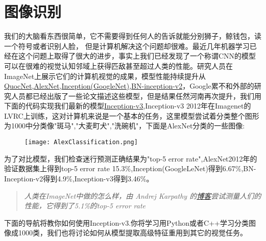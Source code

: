 \section{图像识别}
我们的大脑看东西很简单，它不需要得到任何人的告诉就能分别狮子，鲸钱包，读一个符号或者识别人脸，
但是计算机解决这个问题却很难。最近几年机器学习已经在这个问题上取得了很大的进步，事实上我们已经发现了一个称谓CNN的模型可以在很难的视觉认知邻域上获得匹敌甚至超过人类的性能。研究人员在ImageNet上展示它们的计算机视觉的成果，模型性能持续提升从\href{http://static.googleusercontent.com/media/research.google.com/en//archive/unsupervised_icml2012.pdf}{QuocNet},\href{http://www.cs.toronto.edu/~fritz/absps/imagenet.pdf}{AlexNet},\href{http://arxiv.org/abs/1409.4842}{Inception(GoogleNet)},\href{http://arxiv.org/abs/1502.03167}{BN-inception-v2}，Google累不和外部的研究人员都已经出版了一些论文描述这些模型，但是结果任然河南再次提升，我们用下面的代码实现我们最新的模型\href{http://arxiv.org/abs/1512.00567}{Inception-v3},Inception-v3 2012年在Imagenet的LVRC上训练，这对计算机来说是一个基本的任务，这里模型尝试着分类整个图形为1000中分类像"斑马","大麦町犬","洗碗机"，下面是AlexNet分类的一些图像:
\begin{center}
\begin{figure}[H]
	\centering
	\texttt{[image: AlexClassification.png]}
\end{figure}
\end{center}
为了对比模型，我们检查迷行预测正确结果为"top-5 error rate",AlexNet2012年的验证数据集上得到top-5 error rate 15.3\%,Inception(GoogleLeNet)得到6.67\%,BN-Inception-v2得到4.9\%,Inception-v3得到3.46\%。
\begin{quote}
\emph{人类在ImageNet中做的怎么样，由 Andrej Karpathy 的\href{http://karpathy.github.io/2014/09/02/what-i-learned-from-competing-against-a-convnet-on-imagenet/}{博客}尝试测量人们的性能，它得到了5.1\%的top-5 error rate}
\end{quote}
下面的导航将教你如何使用Inception-v3.你将学习用Python或者C++学习分类图像成1000类，我们也将讨论如何从模型提取高级特征重用到其它的视觉任务。
